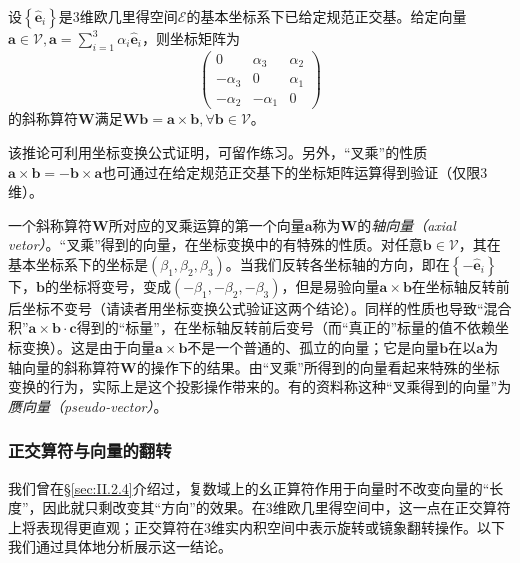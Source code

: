 \documentclass[main.tex]{subfiles}
\begin{document}
\begin{corollary}
    设$\left\{\mathbf{\hat{e}}_i\right\}$是3维欧几里得空间$\mathcal{E}$的基本坐标系下已给定规范正交基。给定向量$\mathbf{a}\in\mathcal{V},\mathbf{a}=\sum_{i=1}^3\alpha_i\mathbf{\hat{e}}_i$，则坐标矩阵为
    \[\left(\begin{array}{ccc}0&\alpha_3&\alpha_2\\-\alpha_3&0&\alpha_1\\-\alpha_2&-\alpha_1&0\end{array}\right)\]
    的斜称算符$\mathbf{W}$满足$\mathbf{Wb}=\mathbf{a}\times\mathbf{b},\forall\mathbf{b}\in\mathcal{V}$。
\end{corollary}
该推论可利用坐标变换公式证明，可留作练习。另外，“叉乘”的性质$\mathbf{a}\times\mathbf{b}=-\mathbf{b}\times\mathbf{a}$也可通过在给定规范正交基下的坐标矩阵运算得到验证（仅限3维）。

一个斜称算符$\mathbf{W}$所对应的叉乘运算的第一个向量$\mathbf{a}$称为$\mathbf{W}$的\emph{轴向量（axial vetor）}。“叉乘”得到的向量，在坐标变换中的有特殊的性质。对任意$\mathbf{b}\in\mathcal{V}$，其在基本坐标系下的坐标是$\left(\beta_1,\beta_2,\beta_3\right)$。当我们反转各坐标轴的方向，即在$\left\{-\mathbf{\hat{e}}_i\right\}$下，$\mathbf{b}$的坐标将变号，变成$\left(-\beta_1,-\beta_2,-\beta_3\right)$，但是易验向量$\mathbf{a}\times\mathbf{b}$在坐标轴反转前后坐标不变号（请读者用坐标变换公式验证这两个结论）。同样的性质也导致“混合积”$\mathbf{a}\times\mathbf{b}\cdot\mathbf{c}$得到的“标量”，在坐标轴反转前后变号（而“真正的”标量的值不依赖坐标变换）。这是由于向量$\mathbf{a}\times\mathbf{b}$不是一个普通的、孤立的向量；它是向量$\mathbf{b}$在以$\mathbf{a}$为轴向量的斜称算符$\mathbf{W}$的操作下的结果。由“叉乘”所得到的向量看起来特殊的坐标变换的行为，实际上是这个投影操作带来的。有的资料称这种“叉乘得到的向量”为\emph{赝向量（pseudo-vector）}。

\subsubsection{正交算符与向量的翻转}
我们曾在\S \ref{sec:II.2.4}介绍过，复数域上的幺正算符作用于向量时不改变向量的“长度”，因此就只剩改变其“方向”的效果。在3维欧几里得空间中，这一点在正交算符上将表现得更直观；正交算符在3维实内积空间中表示旋转或镜象翻转操作。以下我们通过具体地分析展示这一结论。
\end{document}

